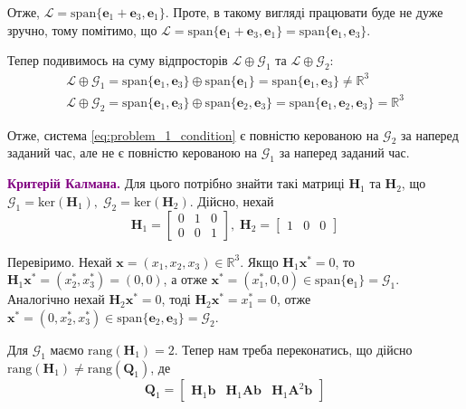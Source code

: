 \documentclass[oneside,solution]{karazin-control-assign}
\begin{document}
Отже, $\mathcal{L} = \text{span}\{\mathbf{e}_1 + \mathbf{e}_3, \mathbf{e}_1\}$. Проте, в такому вигляді працювати буде не дуже зручно, тому помітимо, що $\mathcal{L} = \text{span}\{\mathbf{e}_1 + \mathbf{e}_3, \mathbf{e}_1\} = \text{span}\{\mathbf{e}_1, \mathbf{e}_3\}$. 

Тепер подивимось на суму відпросторів $\mathcal{L} \oplus \mathcal{G}_1$ та $\mathcal{L} \oplus \mathcal{G}_2$:
\begin{gather}
    \mathcal{L} \oplus \mathcal{G}_1 = \text{span}\{\mathbf{e}_1, \mathbf{e}_3\} \oplus \text{span}\{\mathbf{e}_1\} = \text{span}\{\mathbf{e}_1, \mathbf{e}_3\} \neq \mathbb{R}^3 \\
    \mathcal{L} \oplus \mathcal{G}_2 = \text{span}\{\mathbf{e}_1, \mathbf{e}_3\} \oplus \text{span}\{\mathbf{e}_2, \mathbf{e}_3\} = \text{span}\{\mathbf{e}_1, \mathbf{e}_2, \mathbf{e}_3\} = \mathbb{R}^3
\end{gather}

Отже, система \ref{eq:problem_1_condition} є повністю керованою на $\mathcal{G}_2$ за наперед заданий час, але не є повністю керованою на $\mathcal{G}_1$ за наперед заданий час.

\textcolor{purple}{\textbf{Критерій Калмана.}} Для цього потрібно знайти такі матриці $\boldsymbol{H}_1$ та $\boldsymbol{H}_2$, що $\mathcal{G}_1=\text{ker}(\boldsymbol{H}_1), \; \mathcal{G}_2 = \text{ker}(\boldsymbol{H}_2)$. Дійсно, нехай
\begin{equation}
    \boldsymbol{H}_1 = \begin{bmatrix}
        0 & 1 & 0 \\
        0 & 0 & 1
    \end{bmatrix}, \; \boldsymbol{H}_2 = \begin{bmatrix}
        1 & 0 & 0
    \end{bmatrix}
\end{equation}

Перевіримо. Нехай $\mathbf{x} = (x_1,x_2,x_3) \in \mathbb{R}^3$. Якщо $\boldsymbol{H}_1\mathbf{x}^* = 0$, то $\boldsymbol{H}_1\mathbf{x}^* = (x_2^*,x_3^*) = (0, 0)$, а отже $\mathbf{x}^* = (x_1^*, 0,0) \in \text{span}\{\mathbf{e}_1\} = \mathcal{G}_1$. Аналогічно нехай $\boldsymbol{H}_2\mathbf{x}^*=0$, тоді $\boldsymbol{H}_2\mathbf{x}^* = x_1^* = 0$, отже $\mathbf{x}^* = (0, x_2^*, x_3^*) \in \text{span}\{\mathbf{e}_2, \mathbf{e}_3\}=\mathcal{G}_2$. 

Для $\mathcal{G}_1$ маємо $\text{rang}(\boldsymbol{H}_1) = 2$. Тепер нам треба переконатись, що дійсно $\text{rang}(\boldsymbol{H}_1) \neq \text{rang}(\boldsymbol{Q}_1)$, де
\begin{equation}
    \boldsymbol{Q}_1 = \begin{bmatrix}
        \boldsymbol{H}_1\mathbf{b} & \boldsymbol{H}_1\boldsymbol{A}\mathbf{b} &\boldsymbol{H}_1\boldsymbol{A}^2\mathbf{b}
    \end{bmatrix}
\end{equation}
\end{document}
